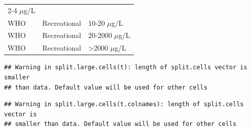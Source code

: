 \documentclass[11pt,]{article}
\begin{document}
\begin{longtable}[c]{@{}lll@{}}
\begin{minipage}[t]{0.20\columnwidth}
2-4 \(\mu\)g/L
\strut\end{minipage}\tabularnewline
\begin{minipage}[t]{0.11\columnwidth}\raggedright\strut
WHO
\strut\end{minipage} &
\begin{minipage}[t]{0.16\columnwidth}\raggedright\strut
Recreational
\strut\end{minipage} &
\begin{minipage}[t]{0.20\columnwidth}\raggedright\strut
10-20 \(\mu\)g/L
\strut\end{minipage}\tabularnewline
\begin{minipage}[t]{0.11\columnwidth}\raggedright\strut
WHO
\strut\end{minipage} &
\begin{minipage}[t]{0.16\columnwidth}\raggedright\strut
Recreational
\strut\end{minipage} &
\begin{minipage}[t]{0.20\columnwidth}\raggedright\strut
20-2000 \(\mu\)g/L
\strut\end{minipage}\tabularnewline
\begin{minipage}[t]{0.11\columnwidth}\raggedright\strut
WHO
\strut\end{minipage} &
\begin{minipage}[t]{0.16\columnwidth}\raggedright\strut
Recreational
\strut\end{minipage} &
\begin{minipage}[t]{0.20\columnwidth}\raggedright\strut
\textgreater{}2000 \(\mu\)g/L
\strut\end{minipage}\tabularnewline
\bottomrule
\end{longtable}

\newpage

\begin{verbatim}
## Warning in split.large.cells(t): length of split.cells vector is smaller
## than data. Default value will be used for other cells
\end{verbatim}

\begin{verbatim}
## Warning in split.large.cells(t.colnames): length of split.cells vector is
## smaller than data. Default value will be used for other cells
\end{verbatim}
\end{document}
